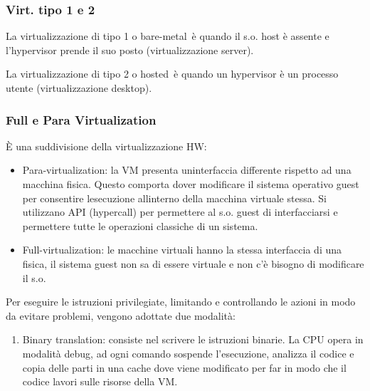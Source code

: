 \documentclass[
]{article}
\providecommand{\tightlist}{%
  \setlength{\itemsep}{0pt}\setlength{\parskip}{0pt}}
\begin{document}
{}

\subsubsection{\texorpdfstring{{Virt. tipo 1 e
2}}{Virt. tipo 1 e 2}}\label{h.kefqvre9zyv}

{La virtualizzazione di tipo 1 o }{bare-metal}{~è quando il s.o. host è
assente e l'hypervisor prende il suo posto (virtualizzazione server).}

{}

{La virtualizzazione di tipo 2 o }{hosted}{~è quando un hypervisor è un
processo utente (virtualizzazione desktop).}

{}

{}

\subsubsection{\texorpdfstring{{Full e Para
Virtualization}}{Full e Para Virtualization}}\label{h.cr6tx6bo912l}

{È una suddivisione della virtualizzazione HW:}

{}

\begin{itemize}
\tightlist
\item
  {Para-virtualization}{: la VM presenta un\textquotesingle interfaccia
  differente rispetto ad una macchina fisica. Questo comporta dover
  modificare il sistema operativo guest per consentire
  l\textquotesingle esecuzione all\textquotesingle interno della
  macchina virtuale stessa. Si utilizzano API (}{hypercall}{) per
  permettere al s.o. guest di interfacciarsi e permettere tutte le
  operazioni classiche di un sistema.}
\end{itemize}

{}

\begin{itemize}
\tightlist
\item
  {Full-virtualization}{: le macchine virtuali hanno la stessa
  interfaccia di una fisica, il sistema guest non sa di essere virtuale
  e non c'è bisogno di modificare il }{s.o.}
\end{itemize}

{Per eseguire le istruzioni privilegiate, limitando e controllando le
azioni in modo da evitare problemi, vengono adottate due modalità:}

\begin{enumerate}
\tightlist
\item
  {Binary translation}{: consiste nel scrivere le istruzioni binarie. La
  CPU opera in modalità debug, ad ogni comando sospende l'esecuzione,
  analizza il codice e copia delle parti in una cache dove viene
  modificato per far in modo che il codice lavori sulle risorse della
  VM.}
\end{enumerate}
\end{document}
